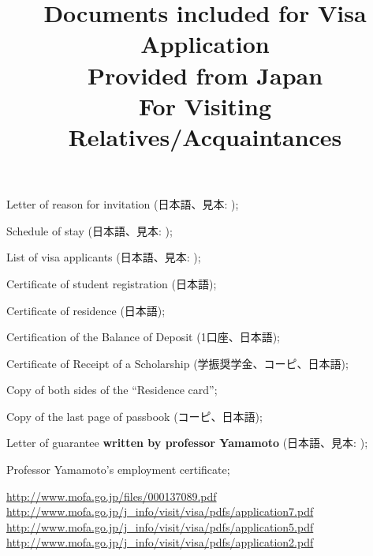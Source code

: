 \documentclass[12pt]{article} %
\title{Documents included for Visa Application\\Provided from Japan\\For Visiting Relatives/Acquaintances}
\newcommand{\cmark}{\ding{51}}%
\newcommand{\done}{\rlap{$\square$}{\raisebox{2pt}{\large\hspace{1pt}\cmark}}%
\hspace{-2.5pt}}
\begin{document}
\maketitle
\begin{todolist}
	\item[\done] Letter of reason for invitation (日本語、見本: \cite{reasonletter});
	\item[\done] Schedule of stay (日本語、見本: \cite{schedule});
	\item[\done] List of visa applicants (日本語、見本: \cite{applicantlist});
	\item[\done] Certificate of student registration (日本語);
	\item[\done] Certificate of residence (日本語);
	\item[\done] Certification of the Balance of Deposit (1口座、日本語);
	\item[\done] Certificate of Receipt of a Scholarship (学振奨学金、コーピ、日本語);
	\item[\done] Copy of both sides of the ``Residence card'';
	\item[\done] Copy of the last page of passbook (コーピ、日本語);
	\item[\done] Letter of guarantee \textbf{written by professor Yamamoto} (日本語、見本: \cite{guarantee});
	\item[\done] Professor Yamamoto's employment certificate;
\end{todolist}

\begin{thebibliography}{9}
	\url{http://www.mofa.go.jp/files/000137089.pdf}
	\url{http://www.mofa.go.jp/j_info/visit/visa/pdfs/application7.pdf}
	\url{http://www.mofa.go.jp/j_info/visit/visa/pdfs/application5.pdf}
	\url{http://www.mofa.go.jp/j_info/visit/visa/pdfs/application2.pdf}
\end{thebibliography}
\end{document}

